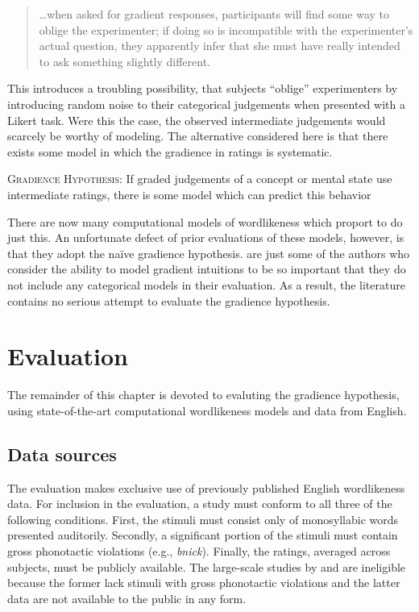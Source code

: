 \begin{quote}
\ldots{}when asked for gradient responses, participants will find some way to oblige the experimenter; if doing so is incompatible with the experimenter's actual question, they apparently infer that she must have really intended to ask something slightly different. \citep[][215]{Schutze2011}
\end{quote}

This introduces a troubling possibility, that subjects ``oblige'' experimenters by introducing random noise to their categorical judgements when presented with a Likert task. Were this the case, the observed intermediate judgements would scarcely be worthy of modeling. The alternative considered here is that there exists some model in which the gradience in ratings is systematic. 

\begin{unlabeledexample}
\textsc{Gradience Hypothesis}: If graded judgements of a concept or mental state use intermediate ratings, there is some model which can predict this behavior
\end{unlabeledexample}

\noindent There are now many computational models of wordlikeness which proport to do just this. An unfortunate defect of prior evaluations of these models, however, is that they adopt the naïve gradience hypothesis. \citet[382]{Hayes2008a} are just some of the authors who consider the ability to model gradient intuitions to be so important that they do not include any categorical models in their evaluation. As a result, the literature contains no serious attempt to evaluate the gradience hypothesis.

\section{Evaluation} \label{2evaluation}

The remainder of this chapter is devoted to evaluting the gradience hypothesis, using state-of-the-art computational wordlikeness models and data from English.

\subsection{Data sources}

The evaluation makes exclusive use of previously published English wordlikeness data. For inclusion in the evaluation, a study must conform to all three of the following conditions. First, the stimuli must consist only of monosyllabic words presented auditorily. Secondly, a significant portion of the stimuli must contain gross phonotactic violations (e.g., \emph{bnick}). Finally, the ratings, averaged across subjects, must be publicly available. The large-scale studies by \citet{Bailey2001} and \citet{Shademan2006,Shademan2007} are ineligible because the former lack stimuli with gross phonotactic violations and the latter data are not available to the public in any form.

